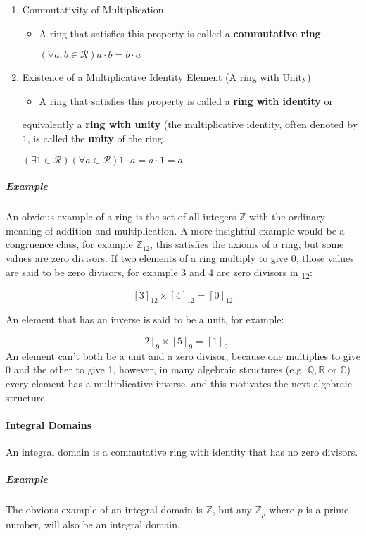 \documentclass[a4paper,11pt,twoside]{article}
\begin{document}
\begin{enumerate}
\item Commutativity of Multiplication
\begin{itemize}
\item A ring that satisfies this property is called a \textbf{commutative ring}

\(\left( \forall a,b \in \mathcal{R} \right) a \cdot  b = b \cdot  a\)
\end{itemize}

\item Existence of a Multiplicative Identity Element (A ring with Unity)
\begin{itemize}
\item A ring that satisfies this property is called a \textbf{ring with identity} or
\end{itemize}
equivalently a \textbf{ring with unity} (the multiplicative identity, often
denoted by \(1\), is called the \textbf{unity} of the ring.

\(\left( \exists 1 \in \mathcal{R} \right) \left( \forall a \in \mathcal{R} \right) 1 \cdot  a = a \cdot  1 = a\)
\end{enumerate}
\subparagraph{Example}
\label{sec:orge6fc582}
An obvious example of a ring is the set of all integers
\(\mathbb{Z}\) with the ordinary meaning of addition and
multiplication. A more insightful example would be a congruence
class, for example \(\mathbb{Z}_{12}\), this satisfies the axioms
of a ring, but some values are zero divisors. If two elements of a
ring multiply to give 0, those values are said to be zero divisors,
for example 3 and 4 are zero divisors in \textsubscript{12}:

\[
       \left[3\right]_{12}\times\left[4\right]_{12}=\left[0\right]_{12}
      \]

An element that has an inverse is said to be a unit, for example:

 \[
     \left[2\right]_{9}\times\left[5\right]_{9}=\left[1\right]_{9}
     \]
An element can't both be a unit and a zero divisor, because one
multiplies to give 0 and the other to give 1, however, in many
algebraic structures (e.g. \(\mathbb{Q}, \mathbb{R}\) or
\(\mathbb{C}\)) every element has a multiplicative inverse, and
this motivates the next algebraic structure. 

\paragraph{Integral Domains}
\label{sec:org75b9387}
An integral domain is a commutative ring with identity that has no
zero divisors.
\subparagraph{Example}
\label{sec:orgce15308}
The obvious example of an integral domain is \(\mathbb{Z}\), but any
\(\mathbb{Z}_p\) where \(p\) is a prime number, will also be an integral domain.
\end{document}
